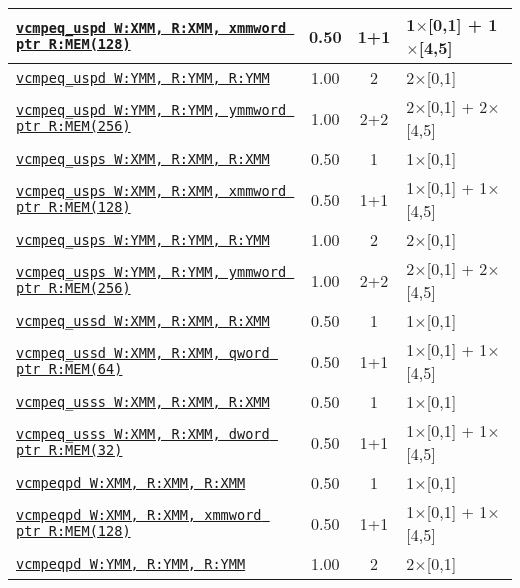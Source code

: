 \documentclass[a4paper,english,fontsize=9]{scrartcl}
\begin{document}
\begin{longtable}{p{}ccL{.25\textwidth}}
  \midrule
  \texttt{\href{https://felixcloutier.com/x86/CMPPD.html}{vcmpeq\_uspd W:XMM, R:XMM, xmmword ptr R:MEM(128)}} & 0.50 & 1+1 & 1\(\times\)[0,1] + 1\(\times\)[4,5] \\
  \midrule
  \texttt{\href{https://felixcloutier.com/x86/CMPPD.html}{vcmpeq\_uspd W:YMM, R:YMM, R:YMM}} & 1.00 & 2 & 2\(\times\)[0,1] \\
  \midrule
  \texttt{\href{https://felixcloutier.com/x86/CMPPD.html}{vcmpeq\_uspd W:YMM, R:YMM, ymmword ptr R:MEM(256)}} & 1.00 & 2+2 & 2\(\times\)[0,1] + 2\(\times\)[4,5] \\
  \midrule
  \texttt{\href{https://felixcloutier.com/x86/CMPPS.html}{vcmpeq\_usps W:XMM, R:XMM, R:XMM}} & 0.50 & 1 & 1\(\times\)[0,1] \\
  \midrule
  \texttt{\href{https://felixcloutier.com/x86/CMPPS.html}{vcmpeq\_usps W:XMM, R:XMM, xmmword ptr R:MEM(128)}} & 0.50 & 1+1 & 1\(\times\)[0,1] + 1\(\times\)[4,5] \\
  \midrule
  \texttt{\href{https://felixcloutier.com/x86/CMPPS.html}{vcmpeq\_usps W:YMM, R:YMM, R:YMM}} & 1.00 & 2 & 2\(\times\)[0,1] \\
  \midrule
  \texttt{\href{https://felixcloutier.com/x86/CMPPS.html}{vcmpeq\_usps W:YMM, R:YMM, ymmword ptr R:MEM(256)}} & 1.00 & 2+2 & 2\(\times\)[0,1] + 2\(\times\)[4,5] \\
  \midrule
  \texttt{\href{https://felixcloutier.com/x86/CMPSD.html}{vcmpeq\_ussd W:XMM, R:XMM, R:XMM}} & 0.50 & 1 & 1\(\times\)[0,1] \\
  \midrule
  \texttt{\href{https://felixcloutier.com/x86/CMPSD.html}{vcmpeq\_ussd W:XMM, R:XMM, qword ptr R:MEM(64)}} & 0.50 & 1+1 & 1\(\times\)[0,1] + 1\(\times\)[4,5] \\
  \midrule
  \texttt{\href{https://felixcloutier.com/x86/CMPSS.html}{vcmpeq\_usss W:XMM, R:XMM, R:XMM}} & 0.50 & 1 & 1\(\times\)[0,1] \\
  \midrule
  \texttt{\href{https://felixcloutier.com/x86/CMPSS.html}{vcmpeq\_usss W:XMM, R:XMM, dword ptr R:MEM(32)}} & 0.50 & 1+1 & 1\(\times\)[0,1] + 1\(\times\)[4,5] \\
  \midrule
  \texttt{\href{https://felixcloutier.com/x86/CMPPD.html}{vcmpeqpd W:XMM, R:XMM, R:XMM}} & 0.50 & 1 & 1\(\times\)[0,1] \\
  \midrule
  \texttt{\href{https://felixcloutier.com/x86/CMPPD.html}{vcmpeqpd W:XMM, R:XMM, xmmword ptr R:MEM(128)}} & 0.50 & 1+1 & 1\(\times\)[0,1] + 1\(\times\)[4,5] \\
  \midrule
  \texttt{\href{https://felixcloutier.com/x86/CMPPD.html}{vcmpeqpd W:YMM, R:YMM, R:YMM}} & 1.00 & 2 & 2\(\times\)[0,1] \\

\end{longtable}
\end{document}
